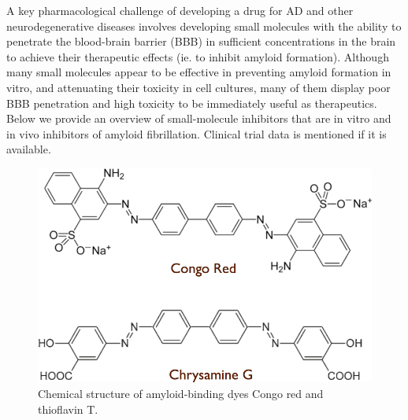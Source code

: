 A key pharmacological challenge of developing a drug for AD and other neurodegenerative diseases involves developing small molecules with the ability to penetrate the blood-brain barrier (BBB) in sufficient concentrations in the brain to achieve their therapeutic effects (ie. to inhibit amyloid formation). Although many small molecules appear to be effective in preventing amyloid formation in vitro, and attenuating their toxicity in cell cultures, many of them display poor BBB penetration and high toxicity to be immediately useful as therapeutics.
Below we provide an overview of small-molecule inhibitors that are in vitro and in vivo inhibitors of amyloid fibrillation.  Clinical trial data is mentioned if it is available.

\begin{figure}
\centering
\includegraphics[width=4.5in]{figures/introduction/dyes.pdf}
\caption[Amyloid-binding dyes]{Chemical structure of amyloid-binding dyes Congo red and thioflavin T.}
\label{fig:amyloid_dyes}
\end{figure}


